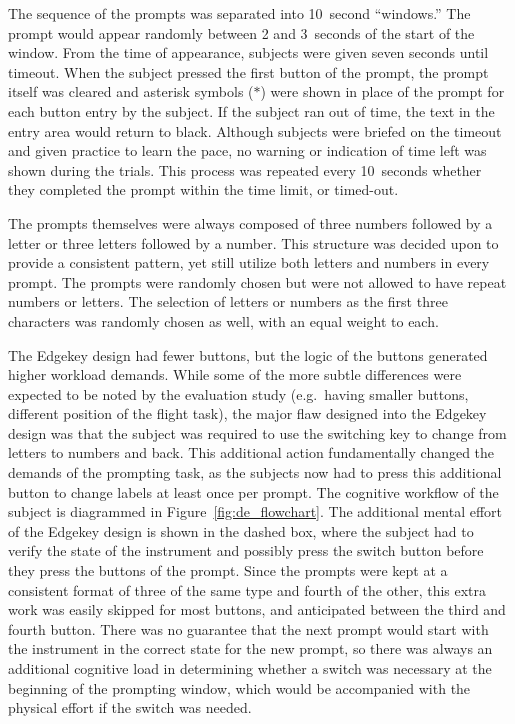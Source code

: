 The sequence of the prompts was separated into 10~second ``windows.''
The prompt would appear randomly between 2 and 3~seconds of the start of the window.
From the time of appearance, subjects were given seven seconds until timeout.
When the subject pressed the first button of the prompt, the prompt itself was cleared and asterisk symbols ($*$) were shown in place of the prompt for each button entry by the subject.
If the subject ran out of time, the text in the entry area would return to black.
Although subjects were briefed on the timeout and given practice to learn the pace, no warning or indication of time left was shown during the trials.
This process was repeated every 10~seconds whether they completed the prompt within the time limit, or timed-out.

The prompts themselves were always composed of three numbers followed by a letter or three letters followed by a number.
This structure was decided upon to provide a consistent pattern, yet still utilize both letters and numbers in every prompt.
The prompts were randomly chosen but were not allowed to have repeat numbers or letters. %
The selection of letters or numbers as the first three characters was randomly chosen as well, with an equal weight to each.

The Edgekey design had fewer buttons, but the logic of the buttons generated higher workload demands.
While some of the more subtle differences were expected to be noted by the evaluation study (e.g.\ having smaller buttons, different position of the flight task), the major flaw designed into the Edgekey design was that the subject was required to use the switching key to change from letters to numbers and back.
This additional action fundamentally changed the demands of the prompting task, as the subjects now had to press this additional button to change labels at least once per prompt.
The cognitive workflow of the subject is diagrammed in Figure~\ref{fig:de_flowchart}.
The additional mental effort of the Edgekey design is shown in the dashed box, where the subject had to verify the state of the instrument and possibly press the switch button before they press the buttons of the prompt.
Since the prompts were kept at a consistent format of three of the same type and fourth of the other, this extra work was easily skipped for most buttons, and anticipated between the third and fourth button.
There was no guarantee that the next prompt would start with the instrument in the correct state for the new prompt, so there was always an additional cognitive load in determining whether a switch was necessary at the beginning of the prompting window, which would be accompanied with the physical effort if the switch was needed.

